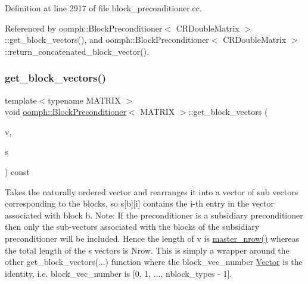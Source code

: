 Definition at line 2917 of file block\+\_\+preconditioner.\+cc.



Referenced by oomph\+::\+Block\+Preconditioner$<$ C\+R\+Double\+Matrix $>$\+::get\+\_\+block\+\_\+vectors(), and oomph\+::\+Block\+Preconditioner$<$ C\+R\+Double\+Matrix $>$\+::return\+\_\+concatenated\+\_\+block\+\_\+vector().

\mbox{\label{classoomph_1_1BlockPreconditioner_a0517a3678def8b89ae69840345a8f838}} 
\subsubsection{\texorpdfstring{get\+\_\+block\+\_\+vectors()}{get\_block\_vectors()}\hspace{0.1cm}{\footnotesize\ttfamily [2/2]}}
{\footnotesize\ttfamily template$<$typename M\+A\+T\+R\+IX $>$ \\
void \hyperlink{classoomph_1_1BlockPreconditioner}{oomph\+::\+Block\+Preconditioner}$<$ M\+A\+T\+R\+IX $>$\+::get\+\_\+block\+\_\+vectors (\begin{DoxyParamCaption}\item[{const \hyperlink{classoomph_1_1DoubleVector}{Double\+Vector} \&}]{v,  }\item[{\hyperlink{classoomph_1_1Vector}{Vector}$<$ \hyperlink{classoomph_1_1DoubleVector}{Double\+Vector} $>$ \&}]{s }\end{DoxyParamCaption}) const}



Takes the naturally ordered vector and rearranges it into a vector of sub vectors corresponding to the blocks, so s\mbox{[}b\mbox{]}\mbox{[}i\mbox{]} contains the i-\/th entry in the vector associated with block b. Note\+: If the preconditioner is a subsidiary preconditioner then only the sub-\/vectors associated with the blocks of the subsidiary preconditioner will be included. Hence the length of v is \hyperlink{classoomph_1_1BlockPreconditioner_a3e5b553f65e6c25354a5c908d507e8ee}{master\+\_\+nrow()} whereas the total length of the s vectors is Nrow. This is simply a wrapper around the other get\+\_\+block\+\_\+vectors(...) function where the block\+\_\+vec\+\_\+number \hyperlink{classoomph_1_1Vector}{Vector} is the identity, i.\+e. block\+\_\+vec\+\_\+number is \mbox{[}0, 1, ..., nblock\+\_\+types -\/ 1\mbox{]}. 



